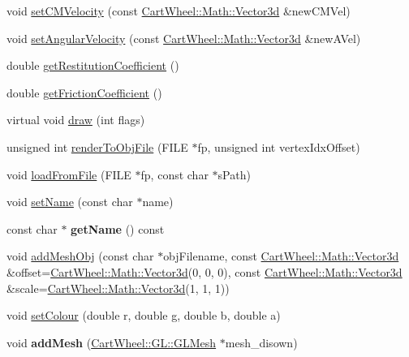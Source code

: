 \begin{DoxyCompactItemize}
\item 
void \hyperlink{classCartWheel_1_1Physics_1_1RigidBody_a86bb81208753da6faabadd52c5151429}{setCMVelocity} (const \hyperlink{classCartWheel_1_1Math_1_1Vector3d}{CartWheel::Math::Vector3d} \&newCMVel)
\item 
void \hyperlink{classCartWheel_1_1Physics_1_1RigidBody_a3ab9df508e46d7d34914b8d15634fa3b}{setAngularVelocity} (const \hyperlink{classCartWheel_1_1Math_1_1Vector3d}{CartWheel::Math::Vector3d} \&newAVel)
\item 
double \hyperlink{classCartWheel_1_1Physics_1_1RigidBody_a8d7b517c70e7b06295d0b683148f37de}{getRestitutionCoefficient} ()
\item 
double \hyperlink{classCartWheel_1_1Physics_1_1RigidBody_a931f7d46adbf71d5d81f3f352f037412}{getFrictionCoefficient} ()
\item 
virtual void \hyperlink{classCartWheel_1_1Physics_1_1RigidBody_a7ab4f12e9d1a403e76022cd8f3124d96}{draw} (int flags)
\item 
unsigned int \hyperlink{classCartWheel_1_1Physics_1_1RigidBody_a8689b1157719fb47697bb860d3c7b5b4}{renderToObjFile} (FILE $\ast$fp, unsigned int vertexIdxOffset)
\item 
void \hyperlink{classCartWheel_1_1Physics_1_1RigidBody_ad6e8faca968625e1e3d4eb24a780d2eb}{loadFromFile} (FILE $\ast$fp, const char $\ast$sPath)
\item 
void \hyperlink{classCartWheel_1_1Physics_1_1RigidBody_a25491da90c53853447ea6e0b098fba3a}{setName} (const char $\ast$name)
\item 
\hypertarget{classCartWheel_1_1Physics_1_1RigidBody_ad662050c063b3b825b83b717d0466fa2}{
const char $\ast$ {\bfseries getName} () const }
\label{classCartWheel_1_1Physics_1_1RigidBody_ad662050c063b3b825b83b717d0466fa2}

\item 
void \hyperlink{classCartWheel_1_1Physics_1_1RigidBody_abc9171bef06daef1be03e0222f3274e6}{addMeshObj} (const char $\ast$objFilename, const \hyperlink{classCartWheel_1_1Math_1_1Vector3d}{CartWheel::Math::Vector3d} \&offset=\hyperlink{classCartWheel_1_1Math_1_1Vector3d}{CartWheel::Math::Vector3d}(0, 0, 0), const \hyperlink{classCartWheel_1_1Math_1_1Vector3d}{CartWheel::Math::Vector3d} \&scale=\hyperlink{classCartWheel_1_1Math_1_1Vector3d}{CartWheel::Math::Vector3d}(1, 1, 1))
\item 
void \hyperlink{classCartWheel_1_1Physics_1_1RigidBody_a02091e3e2f45c75b95697aa3acad0fe1}{setColour} (double r, double g, double b, double a)
\item 
\hypertarget{classCartWheel_1_1Physics_1_1RigidBody_a99b1302a69eb13626e1ca2867ffa676c}{
void {\bfseries addMesh} (\hyperlink{classCartWheel_1_1GL_1_1GLMesh}{CartWheel::GL::GLMesh} $\ast$mesh\_\-disown)}
\label{classCartWheel_1_1Physics_1_1RigidBody_a99b1302a69eb13626e1ca2867ffa676c}


\end{DoxyCompactItemize}
